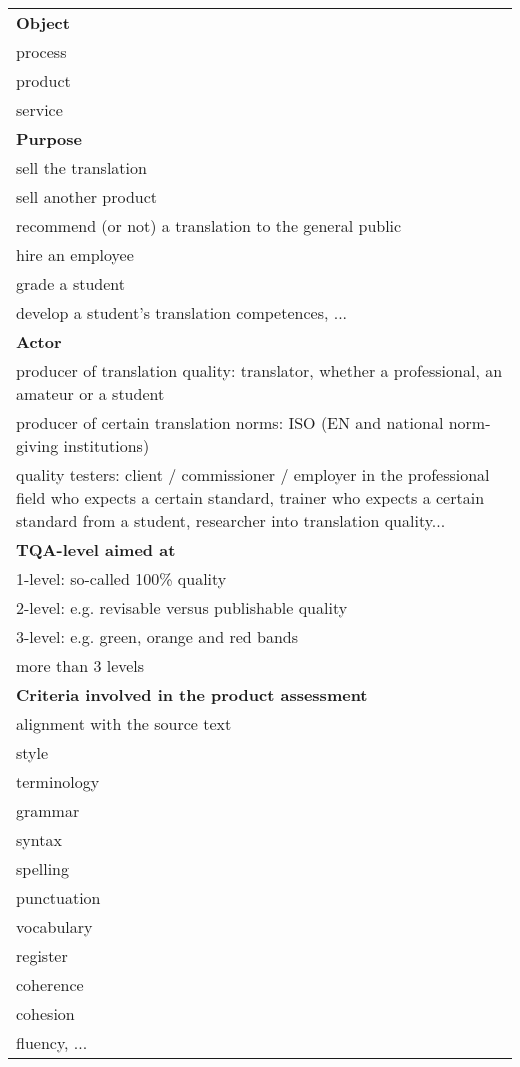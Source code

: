 \documentclass[output=paper]{langsci/langscibook}
\begin{document}
\begin{table}
\footnotesize
\begin{tabularx}{\textwidth}{Q}
\lsptoprule
{\textbf{Object} }\\
 process  \\
 product  \\
 service  \\
 
 \tablevspace 
{\textbf{Purpose} }\\
 sell the translation  \\
 sell another product  \\
 recommend (or not) a translation to the general public  \\
 hire an employee  \\
 grade a student  \\
 develop a student's translation competences, ...  \\
 
 
 \tablevspace 
{\textbf{Actor} }\\
 producer of translation quality: translator, whether a professional, an amateur or a student  \\
 producer of certain translation norms: ISO (EN and national norm-giving institutions)  \\
 quality testers: client / commissioner / employer in the professional field who expects a certain standard, trainer who expects a certain standard from a student, researcher into translation quality...  \\
 
 
 \tablevspace 
{\textbf{TQA-level aimed at} }\\
 {1-level: so-called 100\% quality}\\
 {2-level: e.g. revisable versus publishable quality}\\
 {3-level: e.g. green, orange and red bands}\\
 {more than 3 levels}\\
 
 
 \tablevspace 
{\textbf{Criteria involved in the product assessment}}\\
 {alignment with the source text}\\
 {style}\\
 {terminology}\\
 grammar  \\
 syntax  \\
 spelling  \\
 punctuation  \\
 vocabulary  \\
 register  \\
 coherence  \\
 cohesion  \\
 fluency, ...  \\
 

\end{tabularx}
\end{table}
\end{document}
